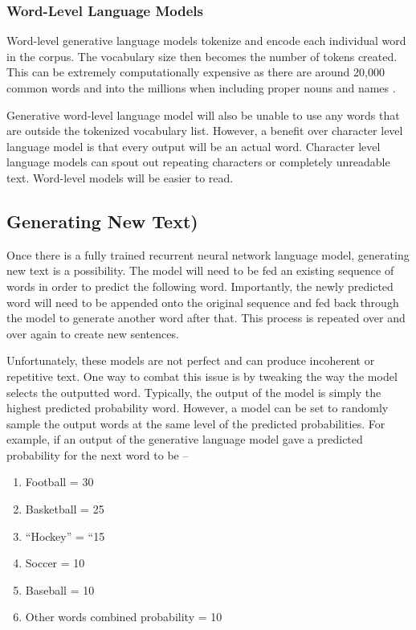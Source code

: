 \documentclass[5p,authoryear]{elsarticle}
\begin{document}
\subsubsection{Word-Level Language Models}\label{word}

Word-level generative language models tokenize and encode each individual word in the corpus. The vocabulary size then becomes the number of tokens created. This can be extremely computationally expensive as there are around 20,000 common words and into the millions when including proper nouns and names \citep{lane}.


Generative word-level language model will also be unable to use any words that are outside the tokenized vocabulary list. However, a benefit over character level language model is that every output will be an actual word. Character level language models can spout out repeating characters or completely unreadable text. Word-level models will be easier to read.


\subsection{Generating New Text)}\label{new text}

Once there is a fully trained recurrent neural network language model, generating new text is a possibility. The model will need to be fed an existing sequence of words in order to predict the following word. Importantly, the newly predicted word will need to be appended onto the original sequence and fed back through the model to generate another word after that. This process is repeated over and over again to create new sentences.

Unfortunately, these models are not perfect and can produce incoherent or repetitive text. One way to combat this issue is by tweaking the way the model selects the outputted word. Typically, the output of the model is simply the highest predicted probability word. However, a model can be set to randomly sample the output words at the same level of the predicted probabilities. For example, if an output of the generative language model gave a predicted probability for the next word to be – 

 
 \begin{enumerate}
 \item Football  = 30%
 \item Basketball = 25%
 \item “Hockey” = “15%
 \item Soccer = 10%
 \item Baseball = 10%
 \item Other words combined probability = 10%
\end{enumerate} \\
  
\end{document}
